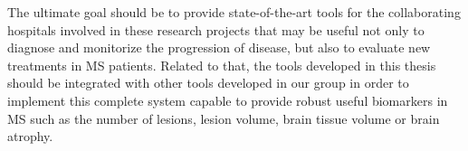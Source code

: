 The ultimate goal should be to provide state-of-the-art tools for the collaborating hospitals involved in these research projects  that may be useful not only to diagnose and  monitorize the progression of disease, but also to evaluate new treatments in MS patients.  Related to that, the tools developed in this thesis should be integrated with other tools developed in our group in order to implement this complete system capable to provide robust useful biomarkers in MS such as the number of lesions, lesion volume, brain tissue volume or brain atrophy. 

